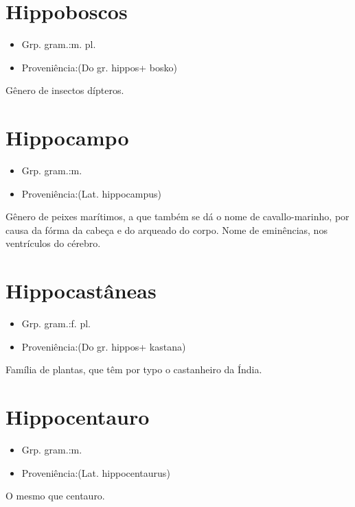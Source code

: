 \documentclass{article}
\begin{document}
\section{Hippoboscos}
\begin{itemize}
\item {Grp. gram.:m. pl.}
\end{itemize}
\begin{itemize}
\item {Proveniência:(Do gr. \textunderscore hippos\textunderscore  + \textunderscore bosko\textunderscore )}
\end{itemize}
Gênero de insectos dípteros.
\section{Hippocampo}
\begin{itemize}
\item {Grp. gram.:m.}
\end{itemize}
\begin{itemize}
\item {Proveniência:(Lat. \textunderscore hippocampus\textunderscore )}
\end{itemize}
Gênero de peixes marítimos, a que também se dá o nome de \textunderscore cavallo-marinho\textunderscore , por causa da fórma da cabeça e do arqueado do corpo.
Nome de eminências, nos ventrículos do cérebro.
\section{Hippocastâneas}
\begin{itemize}
\item {Grp. gram.:f. pl.}
\end{itemize}
\begin{itemize}
\item {Proveniência:(Do gr. \textunderscore hippos\textunderscore  + \textunderscore kastana\textunderscore )}
\end{itemize}
Família de plantas, que têm por typo o castanheiro da Índia.
\section{Hippocentauro}
\begin{itemize}
\item {Grp. gram.:m.}
\end{itemize}
\begin{itemize}
\item {Proveniência:(Lat. \textunderscore hippocentaurus\textunderscore )}
\end{itemize}
O mesmo que \textunderscore centauro\textunderscore .
\end{document}
